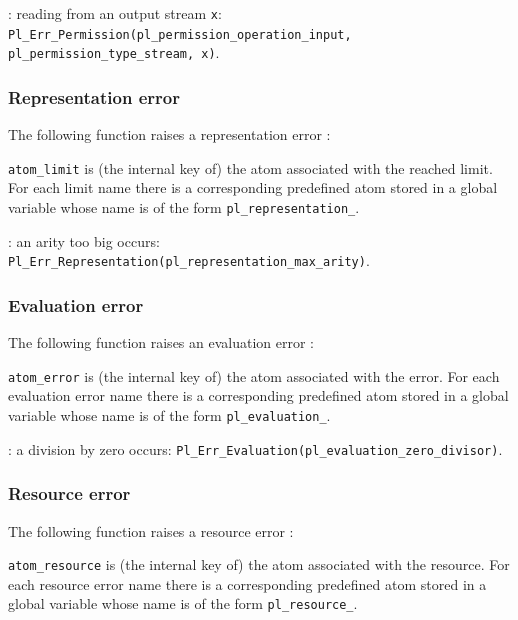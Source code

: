 : reading from an output stream \texttt{x}:
\texttt{Pl\_Err\_Permission(pl\_permission\_operation\_input, \\
pl\_permission\_type\_stream, x)}.

\subsubsection{Representation error}
The following function raises a representation error :


\texttt{atom\_limit} is (the internal key of) the atom associated with the
reached limit. For each limit name  there is a
corresponding predefined atom stored in a global variable whose name is of
the form \texttt{pl\_representation\_}.

: an arity too big occurs:
\texttt{Pl\_Err\_Representation(pl\_representation\_max\_arity)}.

\subsubsection{Evaluation error}
The following function raises an evaluation error :


\texttt{atom\_error} is (the internal key of) the atom associated with the
error. For each evaluation error name  there is a
corresponding predefined atom stored in a global variable whose name is of
the form \texttt{pl\_evaluation\_}.

: a division by zero occurs:
\texttt{Pl\_Err\_Evaluation(pl\_evaluation\_zero\_divisor)}.

\subsubsection{Resource error}
The following function raises a resource error :


\texttt{atom\_resource} is (the internal key of) the atom associated with the
resource. For each resource error name  there is a
corresponding predefined atom stored in a global variable whose name is of
the form \texttt{pl\_resource\_}.

